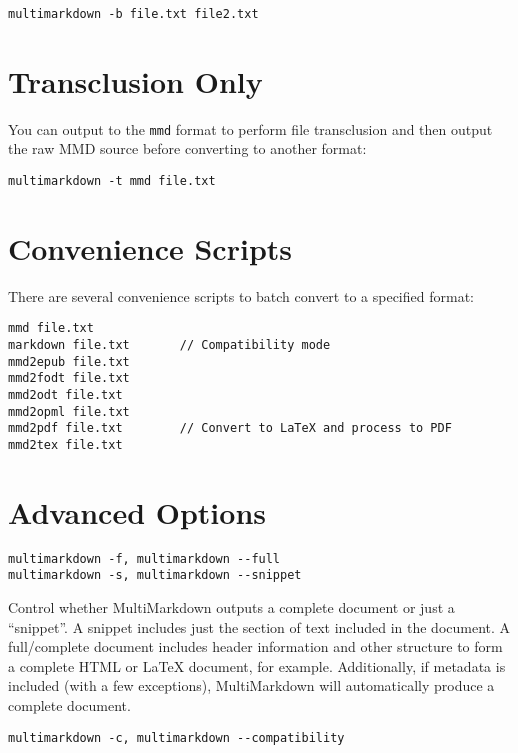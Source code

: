 \begin{verbatim}
multimarkdown -b file.txt file2.txt
\end{verbatim}

\section{Transclusion Only}
\label{transclusiononly}

You can output to the \texttt{mmd} format to perform file transclusion and then output the raw \gls{MMD} source before converting to another format:

\begin{verbatim}
multimarkdown -t mmd file.txt
\end{verbatim}

\section{Convenience Scripts}
\label{conveniencescripts}

There are several convenience scripts to batch convert to a specified format:

\begin{verbatim}
mmd file.txt
markdown file.txt		// Compatibility mode
mmd2epub file.txt
mmd2fodt file.txt
mmd2odt file.txt
mmd2opml file.txt
mmd2pdf file.txt		// Convert to LaTeX and process to PDF
mmd2tex file.txt
\end{verbatim}

\section{Advanced Options}
\label{advancedoptions}

\begin{verbatim}
multimarkdown -f, multimarkdown --full
multimarkdown -s, multimarkdown --snippet
\end{verbatim}

Control whether MultiMarkdown outputs a complete document or just a ``snippet''. A snippet includes just the section of text included in the document. A full\slash complete document includes header information and other structure to form a complete HTML or LaTeX document, for example. Additionally, if metadata is included (with a few exceptions), MultiMarkdown will automatically produce a complete document.

\begin{verbatim}
multimarkdown -c, multimarkdown --compatibility
\end{verbatim}

